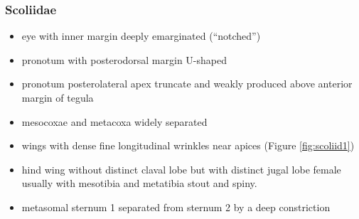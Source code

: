 \documentclass[letterpaper, 11pt]{article}
\begin{document}
\subsubsection{Scoliidae}
\begin{itemize}
\item eye with inner margin deeply emarginated (``notched'')
\item pronotum with posterodorsal margin U-shaped 
\item pronotum posterolateral apex truncate and weakly produced above anterior margin of tegula
\item mesocoxae and metacoxa widely separated 
\item wings with dense fine longitudinal wrinkles near apices (Figure \ref{fig:scoliid1})
\item hind wing without distinct claval lobe but with distinct jugal lobe
female usually with mesotibia and metatibia stout and spiny. 
\item metasomal sternum 1 separated from sternum 2 by a deep constriction 
\end{itemize}
\end{document}
